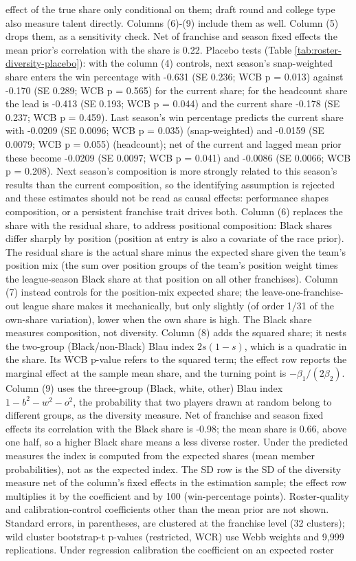 \begin{table}[!h]
{\begin{threeparttable}
\begin{tablenotes}[para]
effect of the true share only conditional on them; draft round and college type also measure talent directly. Columns (6)-(9) include them as well. Column (5) drops them, as a sensitivity check. Net of franchise and season fixed effects the mean prior's correlation with the  share is 0.22. Placebo tests (Table \ref{tab:roster-diversity-placebo}): with the column (4) controls, next season's snap-weighted share enters the win percentage with -0.631 (SE 0.236; WCB p = 0.013) against -0.170 (SE 0.289; WCB p = 0.565) for the current share; for the headcount share the lead is -0.413 (SE 0.193; WCB p = 0.044) and the current share -0.178 (SE 0.237; WCB p = 0.459). Last season's win percentage predicts the current share with -0.0209 (SE 0.0096; WCB p = 0.035) (snap-weighted) and -0.0159 (SE 0.0079; WCB p = 0.055) (headcount); net of the current and lagged mean prior these become -0.0209 (SE 0.0097; WCB p = 0.041) and -0.0086 (SE 0.0066; WCB p = 0.208). Next season's composition is more strongly related to this season's results than the current composition, so the identifying assumption is rejected and these estimates should not be read as causal effects: performance shapes composition, or a persistent franchise trait drives both. Column (6) replaces the share with the residual share, to address positional composition: Black shares differ sharply by position (position at entry is also a covariate of the race prior). The residual share is the actual share minus the expected share given the team's position mix (the sum over position groups of the team's position weight times the league-season Black share at that position on all other franchises). Column (7) instead controls for the position-mix expected share; the leave-one-franchise-out league share makes it mechanically, but only slightly (of order 1/31 of the own-share variation), lower when the own share is high. The Black share measures composition, not diversity. Column (8) adds the squared share; it nests the two-group (Black/non-Black) Blau index $2s(1-s)$, which is a quadratic in the share. Its WCB p-value refers to the squared term; the effect row reports the marginal effect at the sample mean share, and the turning point is $-\beta_1/(2\beta_2)$. Column (9) uses the three-group (Black, white, other) Blau index $1 - b^2 - w^2 - o^2$, the probability that two players drawn at random belong to different groups, as the diversity measure. Net of franchise and season fixed effects its correlation with the Black share is -0.98; the mean share is 0.66, above one half, so a higher Black share means a less diverse roster. Under the predicted measures the index is computed from the expected shares (mean member probabilities), not as the expected index. The SD row is the SD of the diversity measure net of the column's fixed effects in the estimation sample; the effect row multiplies it by the coefficient and by 100 (win-percentage points). Roster-quality and calibration-control coefficients other than the mean prior are not shown. Standard errors, in parentheses, are clustered at the franchise level (32 clusters); wild cluster bootstrap-t p-values (restricted, WCR) use Webb weights and 9,999 replications. Under regression calibration the coefficient on an expected roster 
\end{tablenotes}
\end{threeparttable}}
\end{table}
